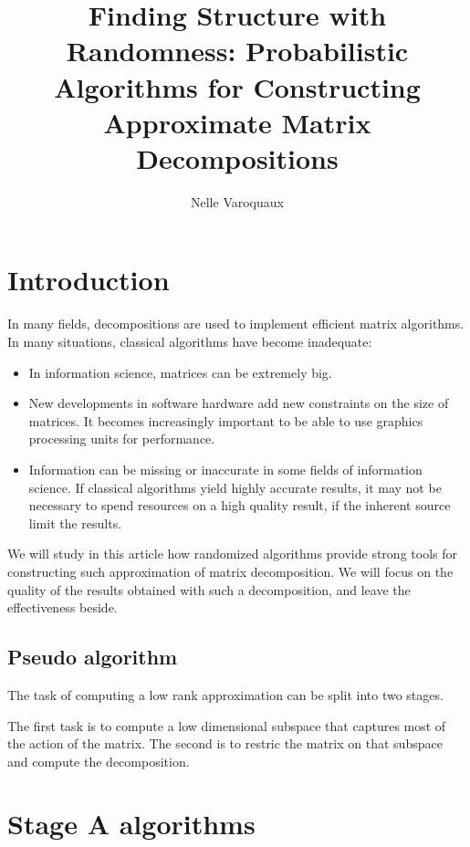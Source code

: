 \documentclass[onecolumn,12pt]{article}
\author{Nelle Varoquaux}
\title{Finding Structure with Randomness: Probabilistic Algorithms for
Constructing Approximate Matrix Decompositions}
\begin{document}
\maketitle
\begin{abstract}
\it{}
\end{abstract}

\tableofcontents

\section{Introduction}

In many fields, decompositions are used to implement efficient matrix
algorithms. In many situations, classical algorithms have become inadequate:

\begin{itemize}
\item In information science, matrices can be extremely big.
\item New developments in software hardware add new constraints on the size of
matrices. It becomes increasingly important to be able to use graphics
processing units for performance.
\item Information can be missing or inaccurate in some fields of information
science. If classical algorithms yield highly accurate results, it may not be
necessary to spend resources on a high quality result, if the inherent
source limit the results.
\end{itemize}

We will study in this article how randomized algorithms provide strong tools
for constructing such approximation of matrix decomposition. We will focus on
the quality of the results obtained with such a decomposition, and leave the
effectiveness beside.


\subsection{Pseudo algorithm}
The task of computing a low rank approximation can be split into two stages.

The first task is to compute a low dimensional subspace that captures most of
the action of the matrix. The second is to restric the matrix on that subspace
and compute the decomposition.

\section{Stage A algorithms}
\end{document}
